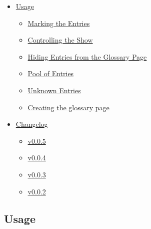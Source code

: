 \begin{itemize}
\tightlist
\item
  \href{https://github.com/typst/packages/raw/main/packages/preview/gloss-awe/0.0.5/\#usage}{Usage}

  \begin{itemize}
  \tightlist
  \item
    \href{https://github.com/typst/packages/raw/main/packages/preview/gloss-awe/0.0.5/\#marking-the-entries}{Marking
    the Entries}
  \item
    \href{https://github.com/typst/packages/raw/main/packages/preview/gloss-awe/0.0.5/\#controlling-the-show}{Controlling
    the Show}
  \item
    \href{https://github.com/typst/packages/raw/main/packages/preview/gloss-awe/0.0.5/\#hiding-entries-from-the-glossary-page}{Hiding
    Entries from the Glossary Page}
  \item
    \href{https://github.com/typst/packages/raw/main/packages/preview/gloss-awe/0.0.5/\#pool-of-entries}{Pool
    of Entries}
  \item
    \href{https://github.com/typst/packages/raw/main/packages/preview/gloss-awe/0.0.5/\#unknown-entries}{Unknown
    Entries}
  \item
    \href{https://github.com/typst/packages/raw/main/packages/preview/gloss-awe/0.0.5/\#creating-the-glossary-page}{Creating
    the glossary page}
  \end{itemize}
\item
  \href{https://github.com/typst/packages/raw/main/packages/preview/gloss-awe/0.0.5/\#changelog}{Changelog}

  \begin{itemize}
  \tightlist
  \item
    \href{https://github.com/typst/packages/raw/main/packages/preview/gloss-awe/0.0.5/\#v005}{v0.0.5}
  \item
    \href{https://github.com/typst/packages/raw/main/packages/preview/gloss-awe/0.0.5/\#v004}{v0.0.4}
  \item
    \href{https://github.com/typst/packages/raw/main/packages/preview/gloss-awe/0.0.5/\#v003}{v0.0.3}
  \item
    \href{https://github.com/typst/packages/raw/main/packages/preview/gloss-awe/0.0.5/\#v002}{v0.0.2}
  \end{itemize}
\end{itemize}

\subsection{Usage}\label{usage}

